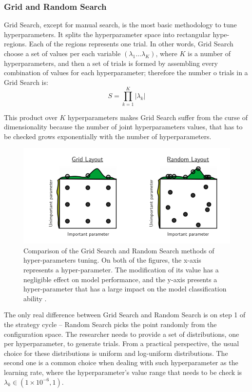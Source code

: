 \subsubsection{Grid and Random Search}
\label{sec:GS and RS}
Grid Search, except for manual search, is the most basic methodology to tune hyperparameters. It splits the hyperparameter space into rectangular hype-regions. Each of the regions represents one trial. In other words, Grid Search choose a set of values per each variable $(\lambda_{1} \ldots \lambda_{K})$, where $K$ is a number of hyperparameters, and then a set of trials is formed by assembling every combination of values for each hyperparameter; therefore the number o trials in a Grid Search is:
\begin{equation}
    S=\prod^{K}_{k=1}|\lambda_{k}|  
\end{equation}

This product over $K$ hyperparameters makes Grid Search suffer from the curse of dimensionality because the number of joint hyperparameters values, that has to be checked grows exponentially with the number of hyperparameters. 

\begin{figure}
\centering
\includegraphics{figures/GridSearch.png}
\caption{Comparison of the Grid Search and Random Search methods of hyper-parameters tuning. 
On both of the figures, the x-axis represents a hyper-parameter. The modification of its value has a negligible effect on model performance, and the y-axis presents a hyper-parameter that has a large impact on the model classification ability \cite{RandomSearch}. 
\label{fig:GridSearch}}
\end{figure} 

The only real difference between Grid Search and Random Search is on step 1 of the strategy cycle – Random Search picks the point randomly from the configuration space. 
The researcher needs to provide a set of distributions, one per hyperparameter, to generate trials. From a practical perspective, the usual choice for these distributions is uniform and log-uniform distributions. The second one is a common choice when dealing with such hyperparameter as the learning rate, where the hyperparameter's value range that needs to be check is   $ \lambda_k \in (1\times 10^{-6},1)$. 



